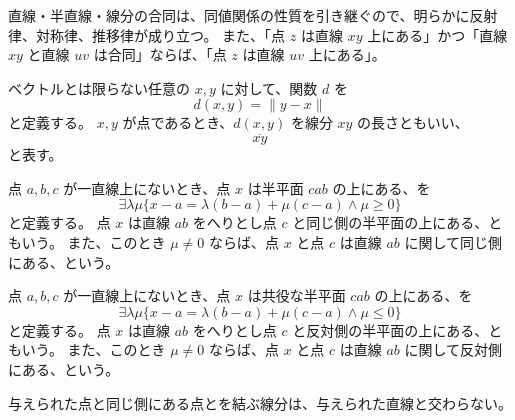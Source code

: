 \begin{col*}
  直線・半直線・線分の合同は、同値関係の性質を引き継ぐので、明らかに反射律、対称律、推移律が成り立つ。
  また、「点 \(z\) は直線 \(xy\) 上にある」かつ「直線 \(xy\) と直線 \(uv\) は合同」ならば、「点 \(z\) は直線 \(uv\) 上にある」。
\end{col*}


\begin{dfn}
  ベクトルとは限らない任意の \(x,y\) に対して、関数 \(d\) を
  \[d(x,y)=\|y-x\|\]
  と定義する。
  \(x,y\) が点であるとき、\(d(x,y)\) を線分 \(xy\) の長さともいい、
  \[\overline{xy}\]
  と表す。
\end{dfn}


\begin{dfn}
  点 \(a,b,c\) が一直線上にないとき、点 \(x\) は半平面 \(cab\) の上にある、を
  \[\exists\lambda\mu\{x-a=\lambda(b-a)+\mu(c-a)\land\mu\geq 0\}\]
  と定義する。
  点 \(x\) は直線 \(ab\) をへりとし点 \(c\) と同じ側の半平面の上にある、ともいう。
  また、このとき \(\mu\neq 0\) ならば、点 \(x\) と点 \(c\) は直線 \(ab\) に関して同じ側にある、という。
\end{dfn}


\begin{dfn}\label{260502235601}
  点 \(a,b,c\) が一直線上にないとき、点 \(x\) は共役な半平面 \(cab\) の上にある、を
  \[\exists\lambda\mu\{x-a=\lambda(b-a)+\mu(c-a)\land\mu\leq 0\}\]
  と定義する。
  点 \(x\) は直線 \(ab\) をへりとし点 \(c\) と反対側の半平面の上にある、ともいう。
  また、このとき \(\mu\neq 0\) ならば、点 \(x\) と点 \(c\) は直線 \(ab\) に関して反対側にある、という。
\end{dfn}


\begin{thm}\label{360424013601}
  与えられた点と同じ側にある点とを結ぶ線分は、与えられた直線と交わらない。
\end{thm}

